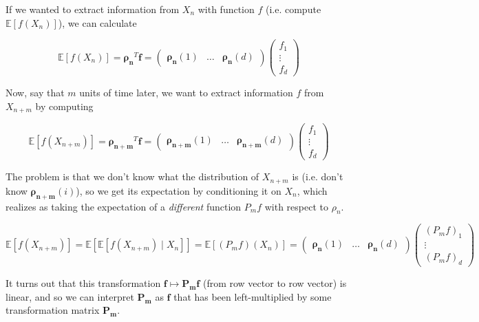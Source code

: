 \documentclass{article}
\begin{document}
  \begin{example}
    If we wanted to extract information from $X_n$ with function $f$ (i.e. compute $\mathbb{E}[f(X_n)]$), we can calculate 

      \[\mathbb{E}[f(X_n)] = \boldsymbol{\rho_n}^T \mathbf{f} =  \begin{pmatrix} \boldsymbol{\rho_n} (1) & \ldots & \boldsymbol{\rho_n} (d) \end{pmatrix} \begin{pmatrix} f_1 \\ \vdots \\ f_d \end{pmatrix}\] 

    Now, say that $m$ units of time later, we want to extract information $f$ from $X_{n + m}$ by computing 

      \[\mathbb{E}[f(X_{n + m})] = \boldsymbol{\rho_{n + m}}^T \mathbf{f} = \begin{pmatrix} \boldsymbol{\rho_{n+m}} (1) & \ldots &  \boldsymbol{\rho_{n+m}} (d) \end{pmatrix} \begin{pmatrix} f_1 \\ \vdots \\ f_d \end{pmatrix}\]

    The problem is that we don't know what the distribution of $X_{n + m}$ is (i.e. don't know $\boldsymbol{\rho_{n + m}} (i)$), so we get its expectation by conditioning it on $X_n$, which realizes as taking the expectation of a \textit{different} function $P_m f$ with respect to $\rho_n$. 

      \[\mathbb{E}[f(X_{n + m})] = \mathbb{E}[ \mathbb{E}[ f(X_{n + m}) \mid X_n]] = \mathbb{E}[(P_m f)(X_n)] = \begin{pmatrix} \boldsymbol{\rho_n} (1) & \ldots & \boldsymbol{\rho_n} (d) \end{pmatrix} \begin{pmatrix} (P_m f)_1 \\ \vdots \\(P_m f)_d \end{pmatrix}\]

    It turns out that this transformation $\mathbf{f} \mapsto \mathbf{P_m} \mathbf{f}$ (from row vector to row vector) is linear, and so we can interpret $\mathbf{P_m}$ as $\mathbf{f}$ that has been left-multiplied by some transformation matrix $\mathbf{P_m}$. 


\end{example}
\end{document}
